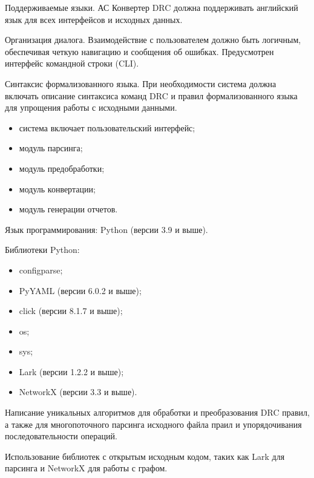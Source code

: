 
Поддерживаемые языки.
АС Конвертер DRC должна поддерживать английский язык
для всех интерфейсов и исходных данных.

Организация диалога.
Взаимодействие с пользователем должно быть логичным,
обеспечивая четкую навигацию и сообщения об ошибках.
Предусмотрен интерфейс командной строки (CLI).

Синтаксис формализованного языка.
При необходимости система должна включать описание синтаксиса команд DRC
и правил формализованного языка для упрощения работы с исходными данными.



\begin{itemize}
	\item система включает пользовательский интерфейс;
	\item модуль парсинга;
	\item модуль предобработки;
	\item модуль конвертации;
	\item модуль генерации отчетов.
\end{itemize}


Язык программирования: Python (версии 3.9 и выше).

Библиотеки Python:

\begin{itemize}
	\item configparse;
	\item PyYAML (версии 6.0.2 и выше);
	\item click (версии 8.1.7 и выше);
	\item os;
	\item sys;
	\item Lark (версии 1.2.2 и выше);
	\item NetworkX (версии 3.3 и выше).
\end{itemize}


Написание уникальных алгоритмов для обработки и преобразования DRC правил,
а также для многопоточного парсинга исходного файла праил
и упорядочивания последовательности операций.


Использование библиотек с открытым исходным кодом,
таких как Lark для парсинга и NetworkX для работы с графом.

